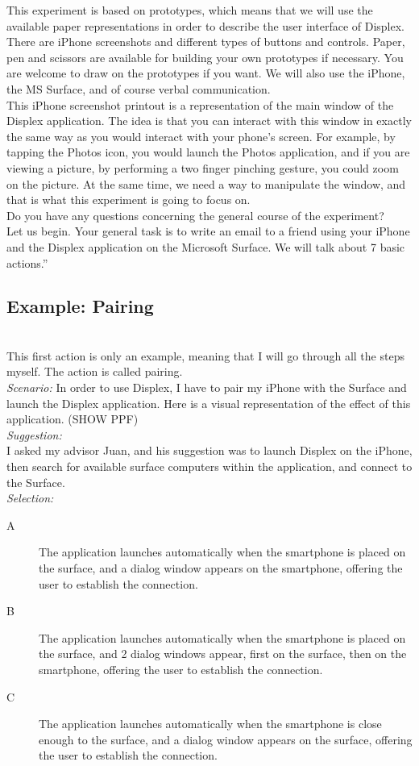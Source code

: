 This experiment is based on prototypes, which means that we will use the available paper representations in order to describe the user interface of Displex.
There are iPhone screenshots and different types of buttons and controls.
Paper, pen and scissors are available for building your own prototypes if necessary.
You are welcome to draw on the prototypes if you want.
We will also use the iPhone, the MS Surface, and of course verbal communication.
\hfill\\
This iPhone screenshot printout is a representation of the main window of the Displex application.
The idea is that you can interact with this window in exactly the same way as you would interact with your phone's screen.
For example, by tapping the Photos icon, you would launch the Photos application, and if you are viewing a picture, by performing a two finger pinching gesture, you could zoom on the picture.
At the same time, we need a way to manipulate the window, and that is what this experiment is going to focus on. 
\hfill\\
Do you have any questions concerning the general course of the experiment?
\hfill\\
Let us begin.
Your general task is to write an email to a friend using your iPhone and the Displex application on the Microsoft Surface.
We will talk about 7 basic actions.''

\subsection{Example: Pairing}
\hfill\\
This first action is only an example, meaning that I will go through all the steps myself.
The action is called pairing.
\hfill\\
\emph{Scenario:}
In order to use Displex, I have to pair my iPhone with the Surface and launch the Displex application.
Here is a visual representation of the effect of this application.
(SHOW PPF)
\hfill\\
\emph{Suggestion:}\\
I asked my advisor Juan, and his suggestion was to launch Displex on the iPhone, then search for available surface computers within the application,  and connect to the Surface.
\hfill\\
\emph{Selection:}
\begin{description}
\item[A]{The application launches automatically when the smartphone is placed on the surface, and a dialog window appears on the smartphone, offering the user to establish the connection.}
\item[B]{The application launches automatically when the smartphone is placed on the surface, and 2 dialog windows appear, first on the surface, then on the smartphone, offering the user to establish the connection.}
\item[C]{The application launches automatically when the smartphone is close enough to the surface, and a dialog window appears on the surface, offering the user to establish the connection.}
\end{description}

